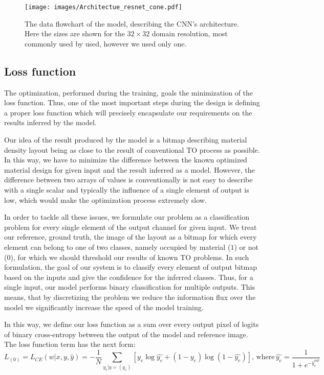 \begin{figure}[h]
	\centering
	\texttt{[image: images/Architectue\_resnet\_cone.pdf]}
	\label{fig:arch_1}
	\caption{The data flowchart of the model, describing the CNN's architecture. Here the sizes are shown for the $32 \times 32$ domain resolution, most commonly used by used, however we used only one.}
\end{figure}


\subsection{Loss function}

The optimization, performed during the training, goals the minimization of the loss function.
Thus, one of the most important steps during the design is defining a proper loss function which will precisely encapsulate our requirements on the results inferred by the model.
\medskip

Our idea of the result produced by the model is a bitmap describing material density layout being as close to the result of conventional TO process as possible.
In this way, we have to minimize the difference between the known optimized material design for given input and the result inferred as a model.
However, the difference between two arrays of values is conventionally is not easy to describe with a single scalar and typically the influence of a single element of output is low, which would make the optimization process extremely slow.
\medskip

In order to tackle all these issues, we formulate our problem as a classification problem for every single element of the output channel for given input. 
We treat our reference, ground truth, the image of the layout as a bitmap for which every element can belong to one of two classes, namely occupied by material ($1$)  or not ($0$), for which we should threshold our results of known TO problems.
In such formulation, the goal of our system is to classify every element of output bitmap based on the inputs and give the confidence for the inferred classes.
Thus, for a single input, our model performs binary classification for multiple outputs.
This means, that by discretizing the problem we reduce the information flux over the model we significantly increase the speed of the model training.
\medskip

In this way, we define our loss function as a sum over every output pixel of logits of binary cross-entropy between the output of the model and reference image.
The loss function term has the next form:
\begin{equation}
 L_{(0)}=L_{CE}(w|x, y, \hat{y}) = -\frac{1}{N} \sum_{y_{e}|y=(y_{e})}^{} [ y_{e} \log \hat{y_{e}} + (1-y_{e}) \log (1-\hat{y_{e}})] , \, \mathrm{where} \, \hat{y_{e}} = \frac{1}{1+e^{-\hat{y}^{out}_{e}}}
 \label{eq:loss_default}
\end{equation}
\medskip

